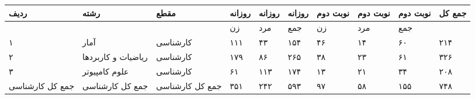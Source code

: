 \documentclass[
  letterpaper,
  DIV=11,
  numbers=noendperiod]{scrreprt}
\newcounter{none} %
\begin{document}
{\def\LTcaptype{none} %
\begin{longtable}[]{@{}
  >{\raggedright\arraybackslash}p{}
  >{\raggedright\arraybackslash}p{}
  >{\raggedright\arraybackslash}p{}
  >{\raggedright\arraybackslash}p{}
  >{\raggedright\arraybackslash}p{}
  >{\raggedright\arraybackslash}p{}
  >{\raggedright\arraybackslash}p{}
  >{\raggedright\arraybackslash}p{}
  >{\raggedright\arraybackslash}p{}
  >{\raggedright\arraybackslash}p{}@{}}
\toprule\noalign{}
\begin{minipage}[b]{\linewidth}\raggedright
ردیف
\end{minipage} & \begin{minipage}[b]{\linewidth}\raggedright
رشته
\end{minipage} & \begin{minipage}[b]{\linewidth}\raggedright
مقطع
\end{minipage} & \begin{minipage}[b]{\linewidth}\raggedright
روزانه
\end{minipage} & \begin{minipage}[b]{\linewidth}\raggedright
روزانه
\end{minipage} & \begin{minipage}[b]{\linewidth}\raggedright
روزانه
\end{minipage} & \begin{minipage}[b]{\linewidth}\raggedright
نوبت دوم
\end{minipage} & \begin{minipage}[b]{\linewidth}\raggedright
نوبت دوم
\end{minipage} & \begin{minipage}[b]{\linewidth}\raggedright
نوبت دوم
\end{minipage} & \begin{minipage}[b]{\linewidth}\raggedright
جمع کل
\end{minipage} \\
\midrule\noalign{}
\endhead
\bottomrule\noalign{}
\endlastfoot
& & & زن & مرد & جمع & زن & مرد & جمع & \\
۱ & آمار & کارشناسی & ۱۱۱ & ۴۳ & ۱۵۴ & ۴۶ & ۱۴ & ۶۰ & ۲۱۴ \\
۲ & ریاضیات و کاربردها & کارشناسی & ۱۷۹ & ۸۶ & ۲۶۵ & ۳۸ & ۲۳ & ۶۱ &
۳۲۶ \\
۳ & علوم کامپیوتر & کارشناسی & ۶۱ & ۱۱۳ & ۱۷۴ & ۱۳ & ۲۱ & ۳۴ & ۲۰۸ \\
جمع کل کارشناسی & جمع کل کارشناسی & جمع کل کارشناسی & ۳۵۱ & ۲۴۲ & ۵۹۳ &
۹۷ & ۵۸ & ۱۵۵ & ۷۴۸ \\
\end{longtable}
}
\end{document}
